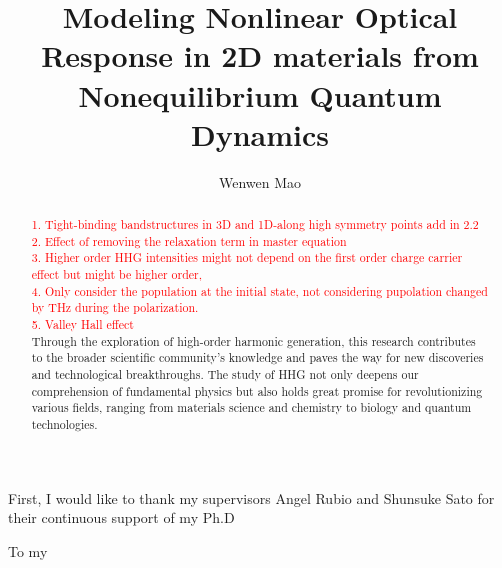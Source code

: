 \documentclass[a4paper, twoside]{NUSThesis}
\title{Modeling Nonlinear Optical Response in 2D materials from Nonequilibrium Quantum Dynamics}
\author{Wenwen Mao}
\begin{document}
\maketitle
\makedeclaration
\frontmatter

\begin{acknowledgments}
    First, I would like to thank my supervisors Angel Rubio and Shunsuke Sato for their continuous support of my Ph.D
\end{acknowledgments}
\clearpage
\begin{dedication}
    \calligra \large To my
\end{dedication}
\clearpage
{
    \tableofcontents
\cleardoublepage
\begin{abstract}
\textcolor{red}{1. Tight-binding bandstructures in 3D and 1D-along high symmetry points add in 2.2}\\
\textcolor{red}{2. Effect of removing the relaxation term in master equation}\\
\textcolor{red}{3. Higher order HHG intensities might not depend on the first order charge carrier
effect but might be higher order, }\\
\textcolor{red}{4. Only consider the population at the initial state, not considering pupolation
changed by THz during the polarization.}\\
\textcolor{red}{5. Valley Hall effect}\\
Through the exploration of high-order harmonic generation, this research contributes to the broader scientific community's knowledge and paves the way for new discoveries and technological breakthroughs. The study of HHG not only deepens our comprehension of fundamental physics but also holds great promise for revolutionizing various fields, ranging from materials science and chemistry to biology and quantum technologies.
\end{abstract}
\listoftables
\listoffigures
}
\printglossary[type=symbols, style=long, title={List of Abbreviations}]
\mainmatter
%






\appendix
% 

%
\backmatter
\begingroup
    \onehalfspacing
    \printbibliography[heading=bibintoc]
\endgroup
\end{document}
